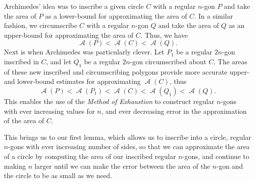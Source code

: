 \documentclass[letterpaper, 12pt]{amsart}
\DeclareMathOperator{\A}{\mathcal{A}}
\theoremstyle{definition}  %
\begin{document}
		Archimedes' idea was to inscribe a given circle $C$ with a regular $n$-gon $P$ and take the area of $P$ as a lower-bound for approximating the area of $C$.
		In a similar fashion, we circumscribe $C$ with a regular $n$-gon $Q$ and take the area of $Q$ as an upper-bound for approximating the area of $C$.
		Thus, we have $$\A(P) < \A(C) < \A(Q).$$
		Next is when Archimedes was particularly clever.
		Let $P_{1}$ be a regular $2n$-gon inscribed in $C$, and let $Q_{1}$ be a regular $2n$-gon circumscribed about $C$.
		The areas of these new inscribed and circumscribing polygons provide more accurate upper- and lower-bound estimates for approximating $\A(C)$, thus $$\A(P) < \A(P_{1}) < \A(C) < \A(Q_{1}) < \A(Q).$$
		This enables the use of the \textit{Method of Exhaustion} to construct regular $n$-gons with ever increasing values for $n$, and ever decreasing error in the approximation of the area of $C$.

		This brings us to our first lemma, which allows us to inscribe into a circle, regular $n$-gons with ever increasing number of sides, so that we can approximate the area of a circle by computing the area of our inscribed regular $n$-gons, and continue to making $n$ larger until we can make the error between the area of the $n$-gon and the circle to be as small as we need.
\end{document}
